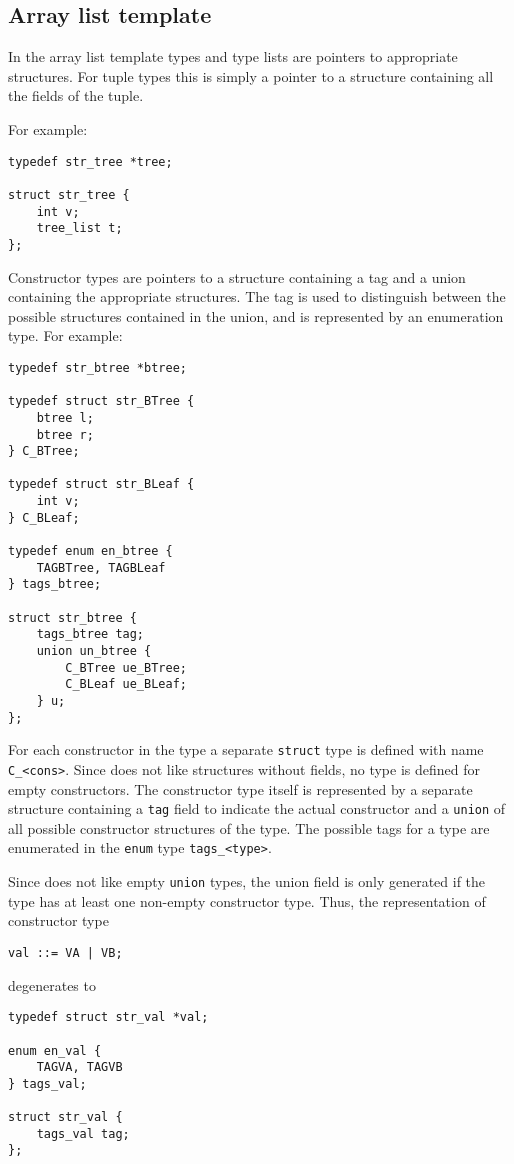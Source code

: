 \subsection{Array list template}
In the array list template {\Tm} types and type lists are pointers
to appropriate structures.
For tuple types this is simply a pointer to a structure containing all the
fields of the tuple.
\par
{}
For example:
\begin{verbatim}
typedef str_tree *tree;

struct str_tree {
    int v;
    tree_list t;
};
\end{verbatim}
Constructor types are pointers to a structure containing
a tag and a union containing the appropriate structures.
The tag is used to distinguish between the possible structures
contained in the union, and is represented by an enumeration type.
For example:
\begin{verbatim}
typedef str_btree *btree;

typedef struct str_BTree {
    btree l;
    btree r;
} C_BTree;

typedef struct str_BLeaf {
    int v;
} C_BLeaf;

typedef enum en_btree {
    TAGBTree, TAGBLeaf
} tags_btree;

struct str_btree {
    tags_btree tag;
    union un_btree {
        C_BTree ue_BTree;
        C_BLeaf ue_BLeaf;
    } u;
};
\end{verbatim}
For each constructor in the type a separate {\tt struct} type is defined
with name {\tt C\_<cons>}.
Since {\C} does not like structures without fields,
no type is defined for empty constructors.
The constructor type itself is represented by a separate structure containing
a {\tt tag} field to indicate the actual constructor
and a {\tt union} of all possible constructor structures of the type.
The possible tags for a type are enumerated in the {\tt enum} type
{\tt tags\_<type>}.
\par
Since {\C} does not like empty {\tt union} types,
the union field is only generated if the type has at least
one non-empty constructor type.
Thus,
the representation of constructor type
\begin{verbatim}
val ::= VA | VB;
\end{verbatim}
degenerates to
\begin{verbatim}
typedef struct str_val *val;

enum en_val {
    TAGVA, TAGVB
} tags_val;

struct str_val {
    tags_val tag;
};
\end{verbatim}
